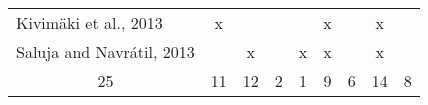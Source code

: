\begin{table}[]
\begin{tabular}{l|cccc|cccc}
Kivim\"{a}ki et al., 2013 \cite{2013.Kivimaki.AGraph-BasedApproach}              & x                                  &                                   &                                     &                                         & x                                                                                &                                        & x                                               &                                                                                      \\
Saluja and Navr\'{a}til, 2013 \cite{2013.Saluja.Graph-BasedUnsupervisedLearning} &                                    & x                                 &                                     & x                                       & x                                                                                &                                        & x                                               &                                                                                      \\ \hline
\multicolumn{1}{c}{25}                                                           & 11                                 & 12                                & 2                                   & 1                                       & 9                                                                                & 6                                      & 14                                              & 8                                                                                    \\ \hline
\end{tabular}
\end{table}
